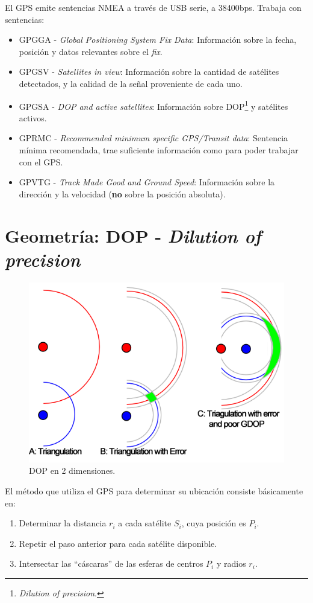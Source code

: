 \documentclass[spanish,12pt,a4paper,titlepage]{report}
\begin{document}
El GPS emite sentencias NMEA a través de USB serie, a 38400bps. Trabaja con sentencias:
\begin{itemize}
\item GPGGA - \textit{Global Positioning System Fix Data}: Información sobre la fecha, posición y datos relevantes sobre el \textit{fix}.
\item GPGSV - \textit{Satellites in view}: Información sobre la cantidad de satélites detectados, y la calidad de la señal proveniente de cada uno.
\item GPGSA - \textit{DOP and active satellites}: Información sobre DOP\footnote{\textit{Dilution of precision}.} y satélites activos.
\item GPRMC - \textit{Recommended minimum specific GPS/Transit data}: Sentencia mínima recomendada, trae suficiente información como para poder trabajar con el GPS.
\item GPVTG - \textit{Track Made Good and Ground Speed}: Información sobre la dirección y la velocidad (\textbf{no} sobre la posición absoluta).
\end{itemize}

\section{Geometría: DOP - \textit{Dilution of precision}}
\label{sec:dop}

\begin{figure}
\vspace{-30pt}
  \begin{center}
    \includegraphics[width=.5\textwidth]{./img/dop.png}
  \end{center}
\vspace{-20pt}
  \caption{DOP en 2 dimensiones.}
\vspace{-50pt}
\label{fig:dop.png}
\end{figure}

El método que utiliza el GPS para determinar su ubicación consiste básicamente en:
\begin{enumerate}
\item Determinar la distancia $r_i$ a cada satélite $S_i$, cuya posición es $P_i$.
\item Repetir el paso anterior para cada satélite disponible.
\item Intersectar las ``cáscaras'' de las esferas de centros $P_i$ y radios $r_i$.
\end{enumerate}
\end{document}
